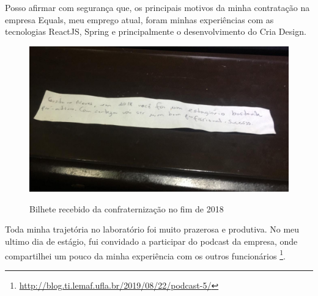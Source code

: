 Posso afirmar com segurança que, os principais motivos da minha contratação na empresa Equals, meu emprego atual, foram minhas experiências com as tecnologias ReactJS, Spring e principalmente o desenvolvimento do Cria Design.

\begin{figure}[H]
\centering
\caption{Bilhete recebido da confraternização no fim de 2018} %

\includegraphics[scale=0.3]{agradecimento}\\  %
\label{fig:exemplo} %
\end{figure}

Toda minha trajetória no laboratório foi muito prazerosa e produtiva. No meu ultimo dia de estágio, fui convidado a participar do podcast da empresa, onde compartilhei um pouco da minha experiência com os outros funcionários \footnote{\url{http://blog.ti.lemaf.ufla.br/2019/08/22/podcast-5/}}.

